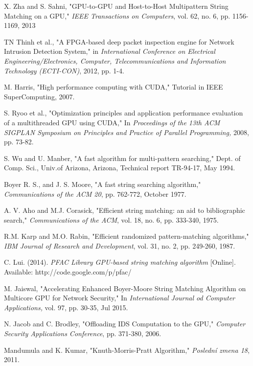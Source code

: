 \begin{thebibliography}{10}
 X. Zha and S. Sahni, "GPU-to-GPU and Host-to-Host Multipattern String Matching on a GPU," \textit{IEEE Transactions on Computers}, vol. 62, no. 6, pp. 1156-1169, 2013

 TN Thinh et al., "A FPGA-based deep packet inspection engine for Network Intrusion Detection System," in \textit{International Conference on Electrical Engineering/Electronics, Computer, Telecommunications and Information Technology (ECTI-CON)}, 2012, pp. 1-4.

M. Harris, "High performance computing with CUDA," Tutorial in IEEE SuperComputing, 2007. 

 S. Ryoo et al., "Optimization principles and application performance evaluation of a multithreaded GPU using CUDA," In \textit{Proceedings of the 13th ACM SIGPLAN Symposium on Principles and Practice of Parallel Programming,} 2008, pp. 73-82.

 S. Wu and U. Manber, "A fast algorithm for multi-pattern searching," Dept. of Comp. Sci., Univ.of Arizona, Arizona, Technical report TR-94-17, May 1994.

Boyer R. S., and J. S. Moore, "A fast string searching algorithm," \textit{Communications of the ACM 20}, pp. 762-772, October 1977.

 A. V. Aho and M.J. Corasick, "Efficient string matching: an aid to bibliographic search," \textit{Communications of the ACM}, vol. 18, no. 6, pp. 333-340, 1975.

 R.M. Karp and M.O. Rabin, "Efficient randomized pattern-matching algorithms," \textit{IBM Journal of Research and Development}, vol. 31, no. 2, pp. 249-260, 1987.

 C. Lui. (2014). \textit{PFAC Library GPU-based string
	matching algorithm} [Online]. Available: http://code.google.com/p/pfac/ 

 M. Jaiswal, "Accelerating Enhanced Boyer-Moore String Matching Algorithm on Multicore GPU for Network Security," In \textit{International Journal
od Computer Applications,} vol. 97, pp. 30-35, Jul 2015.

 N. Jacob and C. Brodley, "Offloading IDS Computation to the
GPU," \textit{Computer Security Applications Conference}, pp. 371-380, 2006.

 Mandumula and K. Kumar, "Knuth-Morris-Pratt Algorithm," \textit{Poslední zmena 18}, 2011.


\end{thebibliography}
